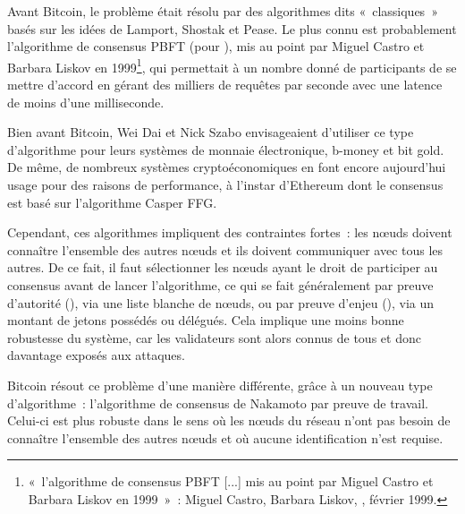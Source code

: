 

Avant Bitcoin, le problème était résolu par des algorithmes dits «~classiques~» basés sur les idées de Lamport, Shostak et Pease. Le plus connu est probablement l'algorithme de consensus PBFT (pour ), mis au point par Miguel Castro et Barbara Liskov en 1999\footnote{«~l'algorithme de consensus PBFT [...] mis au point par Miguel Castro et Barbara Liskov en 1999~»~: Miguel Castro, Barbara Liskov, , février 1999.}, qui permettait à un nombre donné de participants de se mettre d'accord en gérant des milliers de requêtes par seconde avec une latence de moins d'une milliseconde.

Bien avant Bitcoin, Wei Dai et Nick Szabo envisageaient d'utiliser ce type d'algorithme pour leurs systèmes de monnaie électronique, b-money et bit gold. De même, de nombreux systèmes cryptoéconomiques en font encore aujourd'hui usage pour des raisons de performance, à l'instar d'Ethereum dont le consensus est basé sur l'algorithme Casper FFG. %

Cependant, ces algorithmes impliquent des contraintes fortes~: les nœuds doivent connaître l'ensemble des autres nœuds et ils doivent communiquer avec tous les autres. De ce fait, il faut sélectionner les nœuds ayant le droit de participer au consensus avant de lancer l'algorithme, ce qui se fait généralement par preuve d'autorité (), via une liste blanche de nœuds, ou par preuve d'enjeu (), via un montant de jetons possédés ou délégués. Cela implique une moins bonne robustesse du système, car les validateurs sont alors connus de tous et donc davantage exposés aux attaques.



Bitcoin résout ce problème d'une manière différente, grâce à un nouveau type d'algorithme~: l'algorithme de consensus de Nakamoto par preuve de travail. Celui-ci est plus robuste dans le sens où les nœuds du réseau n'ont pas besoin de connaître l'ensemble des autres nœuds et où aucune identification n'est requise.

